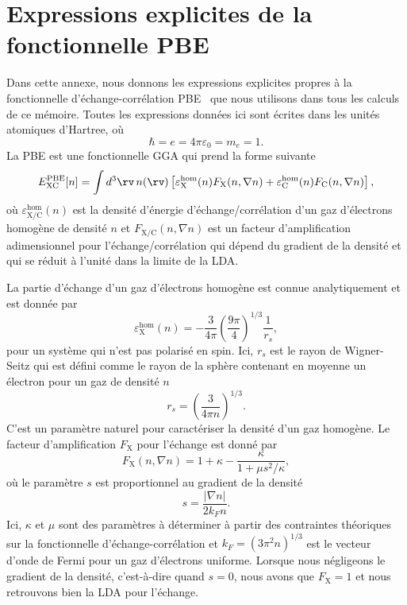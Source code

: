 \chapter{Expressions explicites de la fonctionnelle PBE}\label{annexe:pbe}
\renewcommand{\theequation}{A.\arabic{equation}}

Dans cette annexe, nous donnons les expressions explicites propres à la fonctionnelle d'échange-corrélation PBE~\cite{perdewGeneralizedGradientApproximation1996a} que nous utilisons dans tous les calculs de ce mémoire. Toutes les expressions données ici sont écrites dans les unités atomiques d'Hartree, où
\begin{equation}
    \hbar = e = 4\pi\varepsilon_0 = m_e = 1.
    \label{eqn:a1_unités_hartree}
\end{equation}
La PBE est une fonctionnelle GGA qui prend la forme suivante
\begin{equation}
    E_\text{XC}^\text{PBE}[n]=\int d^3\rv\,n(\rv)\left[\varepsilon_\text{X}^\text{hom}(n)F_\text{X}(n,\nabla n)+\varepsilon_\text{C}^\text{hom}(n)F_\text{C}(n,\nabla n)\right],
    \label{eqn:a1_EPBE}
\end{equation}
où $\varepsilon_\text{X/C}^\text{hom}(n)$ est la densité d'énergie d'échange/corrélation d'un gaz d'électrons homogène de densité $n$ et $F_\text{X/C}(n,\nabla n)$ est un facteur d'amplification adimensionnel pour l'échange/corrélation qui dépend du gradient de la densité et qui se réduit à l'unité dans la limite de la LDA.

La partie d'échange d'un gaz d'électrons homogène est connue analytiquement et est donnée par~\cite{martinElectronicStructureBasic2004}
\begin{equation}
    \varepsilon_\text{X}^\text{hom}(n)=-\frac{3}{4\pi}\left(\frac{9\pi}{4}\right)^{1/3}\frac{1}{r_s},
    \label{eqn:a1_eX}
\end{equation}
pour un système qui n'est pas polarisé en spin. Ici, $r_s$ est le rayon de Wigner-Seitz qui est défini comme le rayon de la sphère contenant en moyenne un électron pour un gaz de densité $n$
\begin{equation}
    r_s = \left(\frac{3}{4\pi n}\right)^{1/3}.
    \label{eqn:a1_rs}
\end{equation}
C'est un paramètre naturel pour caractériser la densité d'un gaz homogène. Le facteur d'amplification $F_\text{X}$ pour l'échange est donné par
\begin{equation} 
    F_\text{X}(n,\nabla n)=1+\kappa-\frac{\kappa}{1+\mu s^2/\kappa},
    \label{eqn:a1_FX}
\end{equation}
où le paramètre $s$ est proportionnel au gradient de la densité
\begin{equation}
    s=\frac{|\nabla n|}{2k_Fn}.
\end{equation}
Ici, $\kappa$ et $\mu$ sont des paramètres à déterminer à partir des contraintes théoriques sur la fonctionnelle d'échange-corrélation et $k_F=(3\pi^2n)^{1/3}$ est le vecteur d'onde de Fermi pour un gaz d'électrons uniforme. Lorsque nous négligeons le gradient de la densité, c'est-à-dire quand $s=0$, nous avons que $F_\text{X}=1$ et nous retrouvons bien la LDA pour l'échange. 

